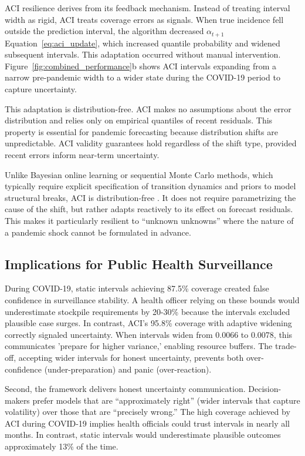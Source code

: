 \documentclass[final,3p,times,twocolumn,authoryear]{elsarticle}
\begin{document}
ACI resilience derives from its feedback mechanism. Instead of treating interval width as rigid, ACI treats coverage errors as signals. When true incidence fell outside the prediction interval, the algorithm decreased $\alpha_{t+1}$ Equation~\eqref{eq:aci_update}, which increased quantile probability and widened subsequent intervals. This adaptation occurred without manual intervention. Figure~\ref{fig:combined_performance}b shows ACI intervals expanding from a narrow pre-pandemic width to a wider state during the COVID-19 period to capture uncertainty.

This adaptation is distribution-free. ACI makes no assumptions about the error distribution and relies only on empirical quantiles of recent residuals. This property is essential for pandemic forecasting because distribution shifts are unpredictable. ACI validity guarantees hold regardless of the shift type, provided recent errors inform near-term uncertainty.

Unlike Bayesian online learning or sequential Monte Carlo methods, which typically require explicit specification of transition dynamics and priors to model structural breaks, ACI is distribution-free \citep{gibbs2021adaptive}. It does not require parametrizing the cause of the shift, but rather adapts reactively to its effect on forecast residuals. This makes it particularly resilient to ``unknown unknowns'' where the nature of a pandemic shock cannot be formulated in advance.

\subsection{Implications for Public Health Surveillance}
During COVID-19, static intervals achieving 87.5\% coverage created false confidence in surveillance stability. A health officer relying on these bounds would underestimate stockpile requirements by 20-30\% because the intervals excluded plausible case surges. In contrast, ACI's 95.8\% coverage with adaptive widening correctly signaled uncertainty. When intervals widen from 0.0066 to 0.0078, this communicates 'prepare for higher variance,' enabling resource buffers. The trade-off, accepting wider intervals for honest uncertainty, prevents both over-confidence (under-preparation) and panic (over-reaction).

Second, the framework delivers honest uncertainty communication. Decision-makers prefer models that are ``approximately right'' (wider intervals that capture volatility) over those that are ``precisely wrong.'' The high coverage achieved by ACI during COVID-19 implies health officials could trust intervals in nearly all months. In contrast, static intervals would underestimate plausible outcomes approximately 13\% of the time.
\end{document}
